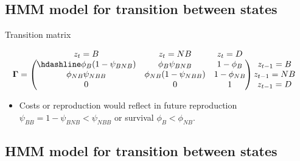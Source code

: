\documentclass[
  12pt,
]{krantz}
\providecommand{\tightlist}{%
  \setlength{\itemsep}{0pt}\setlength{\parskip}{0pt}}
\begin{document}
\hypertarget{hmm-model-for-transition-between-states}{%
\subsection{HMM model for transition between states}\label{hmm-model-for-transition-between-states}}

Transition matrix

\[
\begin{matrix}
& \\
\mathbf{\Gamma} =
    \left ( \vphantom{ \begin{matrix} 12 \\ 12 \\ 12 \end{matrix} } \right .
\end{matrix}
\hspace{-1.2em}
\begin{matrix}
    z_t=B & z_t=NB & z_t=D \\ \hdashline
\phi_B (1-\psi_{BNB}) & \phi_B \psi_{BNB} & 1 - \phi_B\\
\phi_{NB} \psi_{NBB} & \phi_{NB} (1-\psi_{NBB}) & 1 - \phi_{NB}\\
0 & 0 & 1
\end{matrix}
\hspace{-0.2em}
\begin{matrix}
& \\
\left . \vphantom{ \begin{matrix} 12 \\ 12 \\ 12 \end{matrix} } \right )
    \begin{matrix}
    z_{t-1}=B \\ z_{t-1}=NB \\ z_{t-1}=D
    \end{matrix}
\end{matrix}
\]

\begin{itemize}
\tightlist
\item
  Costs or reproduction would reflect in future reproduction \(\psi_{BB} = 1 - \psi_{BNB} < \psi_{NBB}\) or survival \(\phi_B < \phi_{NB}\).
\end{itemize}

\hypertarget{hmm-model-for-transition-between-states-1}{%
\subsection{HMM model for transition between states}\label{hmm-model-for-transition-between-states-1}}
\end{document}
